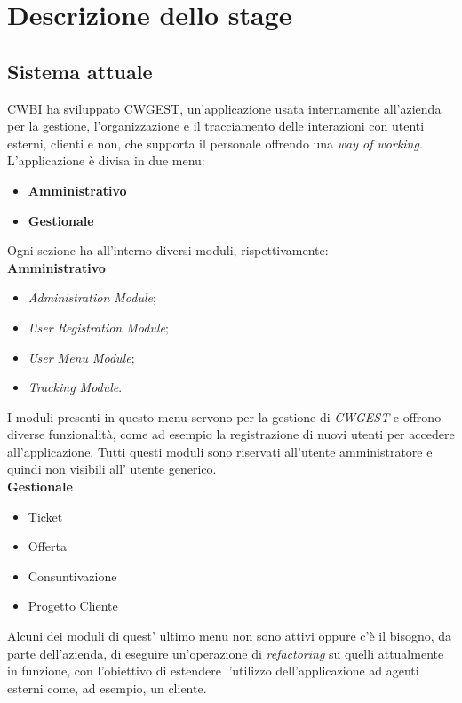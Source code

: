 \chapter{Descrizione dello stage}

\section{Sistema attuale}
CWBI ha sviluppato CWGEST\glsfirstoccur , un'applicazione usata internamente all'azienda per la gestione, l'organizzazione e il tracciamento delle interazioni con utenti esterni, clienti e non, che supporta il personale offrendo una \textit{way of working}. \\
L'applicazione è divisa in due menu:
\begin{itemize}
	\item \textbf{Amministrativo}
	\item \textbf{Gestionale}
\end{itemize}
Ogni sezione ha all'interno diversi moduli, rispettivamente:\\
\textbf{Amministrativo}
\begin{itemize}
\item \textit{Administration Module};
\item \textit{User Registration Module};
\item \textit{User Menu Module};
\item \textit{Tracking Module}.
\end{itemize}
I moduli presenti in questo menu servono per la gestione di \textit{CWGEST} e offrono diverse funzionalità, come ad esempio la registrazione di nuovi utenti per accedere all'applicazione. Tutti questi moduli sono riservati all'utente amministratore e quindi non visibili all' utente generico. \\
\textbf{Gestionale}
\begin{itemize}
\item Ticket 
\item Offerta
\item Consuntivazione
\item Progetto Cliente
\end{itemize}
Alcuni dei moduli di quest' ultimo menu non sono attivi oppure c'è il bisogno, da parte dell'azienda, di eseguire un'operazione di \textit{refactoring\glsfirstoccur}\; su quelli attualmente in funzione, con l'obiettivo di estendere l'utilizzo dell'applicazione ad agenti esterni come, ad esempio, un cliente. 

